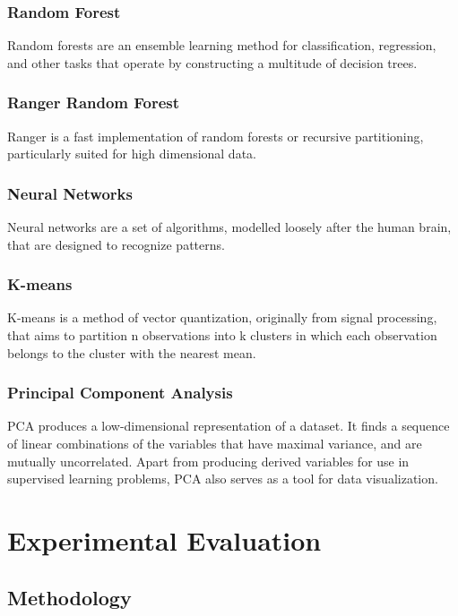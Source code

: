 \documentclass{FR16}
\begin{document}
 \subsubsection{Random Forest}
 Random forests are an ensemble learning method for classification, regression, and other tasks that operate by constructing a multitude of decision trees.
 \subsubsection{Ranger Random Forest}
Ranger is a fast implementation of random forests or recursive partitioning, particularly suited for high dimensional data. 

\subsubsection{Neural Networks}
Neural networks are a set of algorithms, modelled  loosely after the human brain, that are designed to recognize patterns.

\subsubsection{K-means}
K-means is a method of vector quantization, originally from signal processing, that aims to partition n observations into k clusters in which each observation belongs to the cluster with the nearest mean.

\subsubsection{Principal Component Analysis}
PCA produces a low-dimensional representation of a
dataset. It finds a sequence of linear combinations of the
variables that have maximal variance, and are mutually
uncorrelated. Apart from producing derived variables for use in
supervised learning problems, PCA also serves as a tool for
data visualization.

\newpage
\section{Experimental Evaluation}

\subsection{Methodology}
\end{document}
